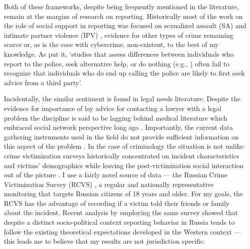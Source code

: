 \documentclass[]{interact}
\theoremstyle{plain}%
\theoremstyle{definition}
\theoremstyle{remark}
\newcommand\citep{\parencite}
\newcommand\citet{\textcite}
\begin{document}
	Both of these frameworks, despite being frequently mentioned in the literature, remain at the margins of research on reporting. Historically most of the work on the role of social support in reporting was focused on sexualized assault (SA) and intimate partner violence (IPV) \citep{paul2014does, patterson2010rape, baert2024factors, allen2007reporting}, evidence for other types of crime remaining scarce \citep{xie2019crime, bergemann2024social} or, as is the case with cybercrime, non-existent, to the best of my knowledge. As \citet{knoth2019reporting} put it, `studies that assess differences between individuals who report to the police, seek alternative help, or do nothing (e.g., \citet{kaukinen2002help}) often fail to recognize that individuals who do end up calling the police are likely to first seek advice from a third party'. 
	
	Incidentally, the similar sentiment is found in legal needs literature. Despite the evidence for importance of lay advice for contacting a lawyer with a legal problem \citep{ogp2019access} the discipline is said to be lagging behind medical literature which embraced social network perspective long ago  \citep{buck2010community}. Importantly, the current data gathering instruments used in the field do not provide sufficient information on this aspect of the problem \citep{abf2025access}. In the case of criminology the situation is not unlike: crime victimization surveys historically concentrated on incident characteristics and victims' demographics while leaving the post-victimization social interaction out of the picture \citep{xie2019crime}. I use a fairly novel source of data --- the Russian Crime Victimization Survey (RCVS) \citep{kuchakov2026rcvs}, a regular and nationally representative monitoring that targets Russian citizens of 18 years and older. For my goals, the RCVS has the advantage of recording if a victim told their friends or family about the incident. Recent analysis by \citet{dzmitryieva2025crime} employing the same survey showed that despite a distinct socio-political context reporting behavior in Russia tends to follow the existing theoretical expectations developed in the Western context --- this leads me to believe that my results are not jurisdiction specific.
	
\end{document}
